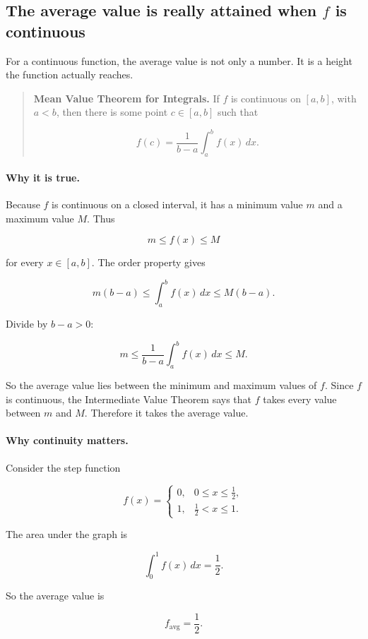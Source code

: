 \subsection{The average value is really attained when \(f\) is continuous}
\label{subsec:average-value-attained}

For a continuous function, the average value is not only a number.  It is a height the
function actually reaches.

\begin{quote}
\textbf{Mean Value Theorem for Integrals.}
If \(f\) is continuous on \([a,b]\), with \(a<b\), then there is some point
\(c\in[a,b]\) such that

\[
\boxed{
f(c)=\frac{1}{b-a}\int_a^b f(x)\,dx.
}
\]
\end{quote}

\paragraph{Why it is true.}
Because \(f\) is continuous on a closed interval, it has a minimum value \(m\) and a
maximum value \(M\).  Thus

\[
m\le f(x)\le M
\]

for every \(x\in[a,b]\).  The order property gives

\[
m(b-a)
\le
\int_a^b f(x)\,dx
\le
M(b-a).
\]

Divide by \(b-a>0\):

\[
m
\le
\frac{1}{b-a}\int_a^b f(x)\,dx
\le
M.
\]

So the average value lies between the minimum and maximum values of \(f\).  Since
\(f\) is continuous, the Intermediate Value Theorem says that \(f\) takes every value
between \(m\) and \(M\).  Therefore it takes the average value.

\paragraph{Why continuity matters.}
Consider the step function

\[
f(x)=
\begin{cases}
0, & 0\le x\le \frac12,\\
1, & \frac12<x\le1.
\end{cases}
\]

The area under the graph is

\[
\int_0^1 f(x)\,dx=\frac12.
\]

So the average value is

\[
f_{\text{avg}}=\frac12.
\]


